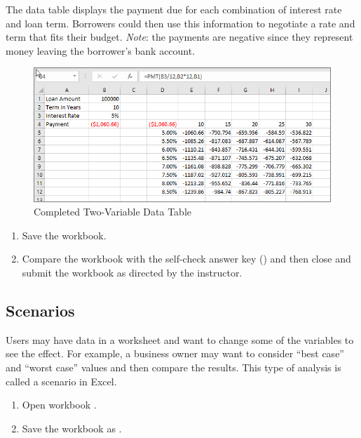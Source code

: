 The data table displays the payment due for each combination of interest rate and loan term. Borrowers could then use this information to negotiate a rate and term that fits their budget. \textit{Note}: the payments are negative since they represent money leaving the borrower's bank account.

\begin{figure}[H]
	\centering
	\includegraphics[width=\maxwidth{.95\linewidth}]{gfx/ch08_fig45}
	\caption{Completed Two-Variable Data Table}
	\label{08:fig45}
\end{figure}

\begin{enumerate}[resume]
	\item Save the  workbook.
	\item Compare the workbook with the self-check answer key () and then close and submit the  workbook as directed by the instructor.

\end{enumerate}

\subsection{Scenarios}

Users may have data in a worksheet and want to change some of the variables to see the effect. For example, a business owner may want to consider ``best case'' and ``worst case'' values and then compare the results. This type of analysis is called a scenario in Excel.

\begin{enumerate}
	\item Open workbook .
	\item Save the workbook as .
\end{enumerate}

